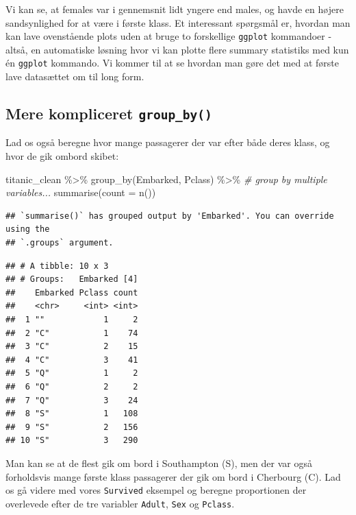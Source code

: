 \documentclass[
]{book}
\newenvironment{Shaded}{\begin{snugshade}}{\end{snugshade}}
\newcommand{\AttributeTok}[1]{\textcolor[rgb]{0.77,0.63,0.00}{#1}}
\newcommand{\CommentTok}[1]{\textcolor[rgb]{0.56,0.35,0.01}{\textit{#1}}}
\newcommand{\FunctionTok}[1]{\textcolor[rgb]{0.00,0.00,0.00}{#1}}
\newcommand{\NormalTok}[1]{#1}
\newcommand{\SpecialCharTok}[1]{\textcolor[rgb]{0.00,0.00,0.00}{#1}}
\begin{document}
Vi kan se, at females var i gennemsnit lidt yngere end males, og havde en højere sandsynlighed for at være i første klass. Et interessant spørgsmål er, hvordan man kan lave ovenstående plots uden at bruge to forskellige \texttt{ggplot} kommandoer - altså, en automatiske løsning hvor vi kan plotte flere summary statistiks med kun én \texttt{ggplot} kommando. Vi kommer til at se hvordan man gøre det med at første lave datasættet om til long form.

\hypertarget{mere-kompliceret-group_by}{%
\subsection{\texorpdfstring{Mere kompliceret \texttt{group\_by()}}{Mere kompliceret group\_by()}}\label{mere-kompliceret-group_by}}

Lad os også beregne hvor mange passagerer der var efter både deres klass, og hvor de gik ombord skibet:

\begin{Shaded}
\begin{Highlighting}[]
\NormalTok{titanic\_clean }\SpecialCharTok{\%\textgreater{}\%}
   \FunctionTok{group\_by}\NormalTok{(Embarked, Pclass) }\SpecialCharTok{\%\textgreater{}\%} \CommentTok{\# group by multiple variables... }
   \FunctionTok{summarise}\NormalTok{(}\AttributeTok{count =} \FunctionTok{n}\NormalTok{())}
\end{Highlighting}
\end{Shaded}

\begin{verbatim}
## `summarise()` has grouped output by 'Embarked'. You can override using the
## `.groups` argument.
\end{verbatim}

\begin{verbatim}
## # A tibble: 10 x 3
## # Groups:   Embarked [4]
##    Embarked Pclass count
##    <chr>     <int> <int>
##  1 ""            1     2
##  2 "C"           1    74
##  3 "C"           2    15
##  4 "C"           3    41
##  5 "Q"           1     2
##  6 "Q"           2     2
##  7 "Q"           3    24
##  8 "S"           1   108
##  9 "S"           2   156
## 10 "S"           3   290
\end{verbatim}

Man kan se at de flest gik om bord i Southampton (S), men der var også forholdsvis mange første klass passagerer der gik om bord i Cherbourg (C). Lad os gå videre med vores \texttt{Survived} eksempel og beregne proportionen der overlevede efter de tre variabler \texttt{Adult}, \texttt{Sex} og \texttt{Pclass}.
\end{document}
